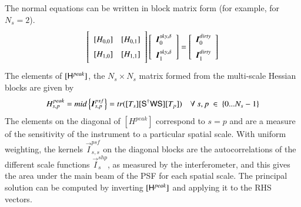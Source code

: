\documentclass[structabstract]{stylefiles/aa}
\newcommand{\F}{{\tens{F}}}
\newcommand{\Fd}{{\tens{F^\dag}}}
\newcommand{\He}{{\tens{H}}}
\newcommand{\Sa}{{\tens{S}}}
\newcommand{\Sd}{{\tens{S^\dag}}}
\newcommand{\W}{{\tens{W}}}
\newcommand{\Wim}{{\tens{W^{im}}}}
\newcommand{\I}{{\vec{I}}}
\begin{document}
\noindent The normal equations can be written in block matrix form (for example, for $N_s=2$).
\begin{equation}
\left[\begin{array}{ll} 
\noalign{\medskip}
   [H_{0,0}] & [H_{0,1}] \\  
\noalign{\medskip}
   [H_{1,0}] & [H_{1,1}]  \\  
\noalign{\medskip}
   \end{array} \right]
\left[\begin{array}{l} \vec{I}^{sky,\delta}_{0} \\ 
\noalign{\medskip}
                       \vec{I}^{sky,\delta}_{1} \end{array}\right] =
\left[\begin{array}{l} \vec{I}^{dirty}_{0}\\
\noalign{\medskip}
		       \vec{I}^{dirty}_{1} \end{array}\right] 
\label{neqn_ms_math}
\end{equation}
%
The elements of $[\He^{peak}]$, the $N_s\times N_s$ matrix formed from the multi-scale Hessian blocks
are given by 
\begin{equation}
H^{peak}_{s,p} = mid\left\{\vec{I}^{psf}_{s,p}\right\} = tr([T_s][\Sd\W\Sa][T_p])~~~~\forall~ s,p ~\in ~\{0 ... N_s-1\}
\label{Eq:hpeak}
\end{equation}
The elements on the diagonal of $[H^{peak}]$ correspond to $s=p$ and 
are a measure of the sensitivity of the instrument to a particular spatial scale. 
With uniform weighting, the kernels $\vec{I}^{psf}_{s,s}$ on the diagonal blocks are 
the autocorrelations of the different scale functions $\vec{I}^{shp}_s$, as measured by the
interferometer, and this gives the area under the main beam of the PSF for each spatial scale.
The principal solution can be computed by inverting $[\He^{peak}]$ and applying it to the
RHS vectors. 
\end{document}
